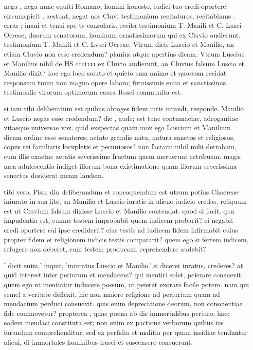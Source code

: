  nega , nega nunc equiti Romano, homini honesto, iudici tuo credi oportere! circumspicit , aestuat, negat nos Cluvi testimonium recitaturos. recitabimus . erras ; inani et tenui spe te consolaris. recita testimonium T. Manili et C. Lusci Ocreae, duorum senatorum, hominum ornatissimorum qui ex Cluvio audierunt. testimonium T. Manili et C. Lvsci Ocreae. Vtrum dicis Luscio et Manilio, an etiam Cluvio non esse credendum? planius atque apertius dicam. Vtrum Luscius et Manilius nihil de HS ccciↄↄↄ ex Cluvio audierunt, an Cluvius falsum Luscio et Manilio dixit? hoc ego loco soluto et quieto sum animo et quorsom recidat responsum tuum non magno opere laboro; firmissimis enim et sanctissimis testimoniis virorum optimorum causa Rosci communita est.

 si iam tibi deliberatum est quibus abroges fidem iuris iurandi, responde. Manilio et Luscio negas esse credendum? dic , aude; est tuae contumaciae, adrogantiae vitaeque universae vox. quid exspectas quam mox ego Luscium et Manilium dicam ordine esse senatores, aetate grandis natu, natura sanctos et religiosos, copiis rei familiaris locupletis et pecuniosos? non faciam; nihil mihi detraham, cum illis exactae aetatis severissime fructum quem meruerunt retribuam. magis mea adulescentia indiget illorum bona existimatione quam illorum severissima senectus desiderat meam laudem.

 tibi vero, Piso, diu deliberandum et concoquendum est utrum potius Chaereae iniurato in sua lite, an Manilio et Luscio iuratis in alieno iudicio credas. reliquum est ut Cluvium falsum dixisse Luscio et Manilio contendat. quod si facit, qua impudentia est, eumne testem improbabit quem iudicem probarit? ei negabit credi oportere cui ipse crediderit? eius testis ad iudicem fidem infirmabit cuius propter fidem et religionem iudicis testis compararit? quem ego si ferrem iudicem, refugere non deberet, cum testem producam, reprehendere audebit?

 ' dicit enim,' inquit, 'iniuratus Luscio et Manilio.' si diceret iuratus, crederes? at quid interest inter periurum et mendacem? qui mentiri solet, peierare consuevit. quem ego ut mentiatur inducere possum, ut peieret exorare facile potero. nam qui semel a veritate deflexit, hic non maiore religione ad periurium quam ad mendacium perduci consuevit. quis enim deprecatione deorum, non conscientiae fide commovetur? propterea , quae poena ab dis immortalibus periuro, haec eadem mendaci constituta est; non enim ex pactione verborum quibus ius iurandum comprehenditur, sed ex perfidia et malitia per quam insidiae tenduntur alicui, di immortales hominibus irasci et suscensere consuerunt.

